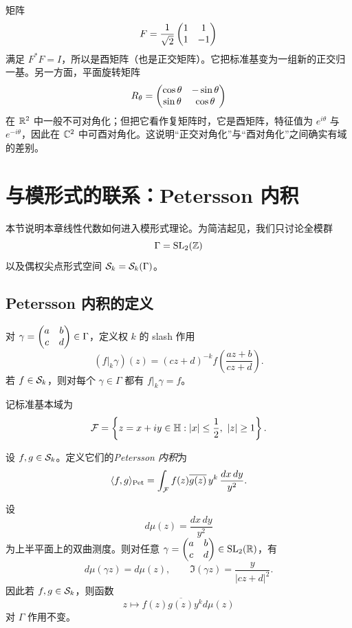 \begin{example}
矩阵
\[
F=\frac{1}{\sqrt2}\begin{pmatrix} 1&1\\1&-1 \end{pmatrix}
\]
满足 $F^*F=I$，所以是酉矩阵（也是正交矩阵）。它把标准基变为一组新的正交归一基。另一方面，平面旋转矩阵
\[
R_\theta=\begin{pmatrix} \cos\theta&-\sin\theta\\ \sin\theta&\cos\theta \end{pmatrix}
\]
在 $\mathbb{R}^2$ 中一般不可对角化；但把它看作复矩阵时，它是酉矩阵，特征值为 $e^{i\theta}$ 与 $e^{-i\theta}$，因此在 $\mathbb{C}^2$ 中可酉对角化。这说明“正交对角化”与“酉对角化”之间确实有域的差别。
\end{example}

\section{与模形式的联系：Petersson 内积}

本节说明本章线性代数如何进入模形式理论。为简洁起见，我们只讨论全模群
\[
\Gamma=\mathrm{SL}_2(\mathbb{Z})
\]
以及偶权尖点形式空间 $\mathcal{S}_k=\mathcal{S}_k(\Gamma)$。

\subsection{Petersson 内积的定义}

对 $\gamma=\begin{pmatrix} a&b\\c&d \end{pmatrix}\in\Gamma$，定义权 $k$ 的 slash 作用
\[
(f|_k\gamma)(z)=(cz+d)^{-k}f\!\left(\frac{az+b}{cz+d}\right).
\]
若 $f\in \mathcal{S}_k$，则对每个 $\gamma\in\Gamma$ 都有 $f|_k\gamma=f$。

记标准基本域为
\[
\mathcal{F}=\left\{z=x+iy\in\HH:|x|\le \frac12,\ |z|\ge 1\right\}.
\]

\begin{definition}
设 $f,g\in \mathcal{S}_k$。定义它们的\emph{Petersson 内积}为
\[
\langle f, g \rangle_{\mathrm{Pet}}=\int_{\mathcal{F}} f(z)\overline{g(z)}\,y^k\,\frac{dx\,dy}{y^2}.
\]
\end{definition}

\begin{lemma}
设
\[
d\mu(z)=\frac{dx\,dy}{y^2}
\]
为上半平面上的双曲测度。则对任意 $\gamma=\begin{pmatrix} a&b\\c&d \end{pmatrix}\in\mathrm{SL}_2(\mathbb{R})$，有
\[
d\mu(\gamma z)=d\mu(z),\qquad \Im(\gamma z)=\frac{y}{|cz+d|^2}.
\]
因此若 $f,g\in \mathcal{S}_k$，则函数
\[
z\longmapsto f(z)\overline{g(z)}y^k d\mu(z)
\]
对 $\Gamma$ 作用不变。
\end{lemma}

